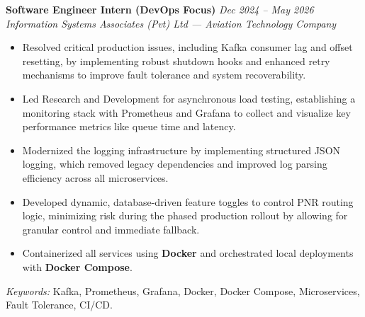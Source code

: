 \textbf{Software Engineer Intern (DevOps Focus)} \hfill \textit{Dec 2024 – May 2026} \\
\textit{Information Systems Associates (Pvt) Ltd — Aviation Technology Company}

\begin{itemize}[leftmargin=*]
    \item Resolved critical production issues, including Kafka consumer lag and offset resetting, by implementing robust shutdown hooks and enhanced retry mechanisms to improve fault tolerance and system recoverability.
    \item Led Research and Development for asynchronous load testing, establishing a monitoring stack with Prometheus and Grafana to collect and visualize key performance metrics like queue time and latency.
    \item Modernized the logging infrastructure by implementing structured JSON logging, which removed legacy dependencies and improved log parsing efficiency across all microservices.
    \item Developed dynamic, database-driven feature toggles to control PNR routing logic, minimizing risk during the phased production rollout by allowing for granular control and immediate fallback.
    \item Containerized all services using \textbf{Docker} and orchestrated local deployments with \textbf{Docker Compose}.
\end{itemize}

\textit{Keywords:} Kafka, Prometheus, Grafana, Docker, Docker Compose, Microservices, Fault Tolerance, CI/CD.

